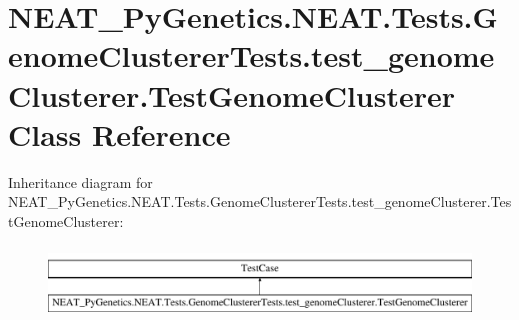 \hypertarget{class_n_e_a_t___py_genetics_1_1_n_e_a_t_1_1_tests_1_1_genome_clusterer_tests_1_1test__genome_clu8e5a0289e00c807a0d74c340ea42f50e}{}\section{N\+E\+A\+T\+\_\+\+Py\+Genetics.\+N\+E\+A\+T.\+Tests.\+Genome\+Clusterer\+Tests.\+test\+\_\+genome\+Clusterer.\+Test\+Genome\+Clusterer Class Reference}
\label{class_n_e_a_t___py_genetics_1_1_n_e_a_t_1_1_tests_1_1_genome_clusterer_tests_1_1test__genome_clu8e5a0289e00c807a0d74c340ea42f50e}
Inheritance diagram for N\+E\+A\+T\+\_\+\+Py\+Genetics.\+N\+E\+A\+T.\+Tests.\+Genome\+Clusterer\+Tests.\+test\+\_\+genome\+Clusterer.\+Test\+Genome\+Clusterer\+:\begin{figure}[H]
\begin{center}
\leavevmode
\includegraphics[height=1.944445cm]{class_n_e_a_t___py_genetics_1_1_n_e_a_t_1_1_tests_1_1_genome_clusterer_tests_1_1test__genome_clu8e5a0289e00c807a0d74c340ea42f50e}
\end{center}
\end{figure}
